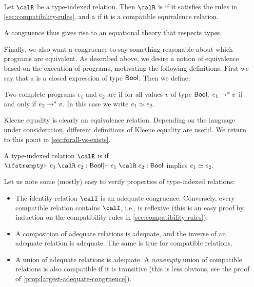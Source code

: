 \begin{definition}
    Let $\calR$ be a type-indexed relation. Then $\calR$ is  if it satisfies the rules in \cref{sec:compatibility-rules}, and a  if it is a compatible equivalence relation.
\end{definition}
%
A congruence thus gives rise to an equational theory that respects types.

Finally, we also want a congruence to say something reasonable about which programs are equivalent. As described above, we desire a notion of equivalence based on the execution of programs, motivating the following definitions. First we say that a  is a closed expression of type $\mathsf{Bool}$. Then we define:

\begin{definition}
    \label{def:kleene-equality}
    Two complete programs $e_1$ and $e_2$ are  if for all values $v$ of type $\mathsf{Bool}$, $e_1 \to^* v$ if and only if $e_2 \to^* v$. In this case we write $e_1 \simeq e_2$.
\end{definition}
%
Kleene equality is clearly an equivalence relation. Depending on the language under consideration, different definitions of Kleene equality are useful. We return to this point in \cref{sec:forall-vs-exists}.


\begin{definition}
    \label{def:adequate-relation}
    A type-indexed relation $\calR$ is  if $\typeindrel{}{}{e_1}{\calR}{e_2}{\typeBool}$ implies $e_1 \simeq e_2$.
\end{definition}

%
Let us note some (mostly) easy to verify properties of type-indexed relations:
%
\begin{itemize}
    \item The identity relation $\calI$ is an adequate congruence. Conversely, every compatible relation contains $\calI$, i.e., is reflexive (this is an easy proof by induction on the compatibility rules in \cref{sec:compatibility-rules}).
    
    \item A composition of adequate relations is adequate, and the inverse of an adequate relation is adequate. The same is true for compatible relations.
    
    \item A union of adequate relations is adequate. A \emph{nonempty} union of compatible relations is also compatible if it is transitive (this is less obvious, see the proof of \cref{prop:largest-adequate-congruence}).
\end{itemize}

